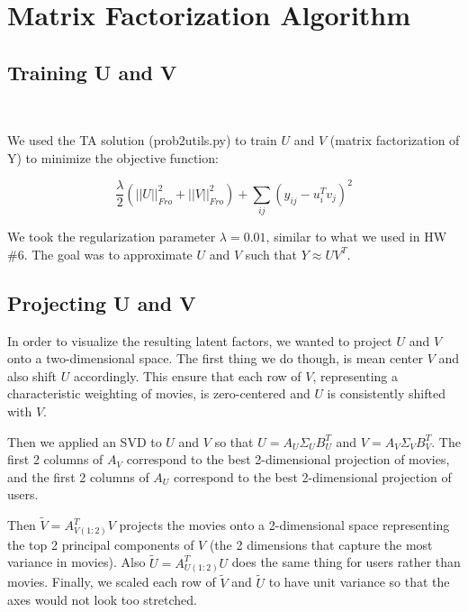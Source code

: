\section{Matrix Factorization Algorithm}

\medskip

\subsection{Training U and V}

~

We used the TA solution (prob2utils.py) to train $U$ and $V$  (matrix factorization of Y) to minimize the objective function:

$$\frac{\lambda}{2} ( ||U||_{Fro}^2 + ||V||_{Fro}^2) + \sum_{ij} (y_{ij} - u_i^T v_j)^2$$

We took the regularization parameter $\lambda = 0.01$, similar to what we used in HW \#6. The goal was to approximate $U$ and $V$ such that $Y \approx U V^T$. 

\subsection{Projecting U and V}

In order to visualize the resulting latent factors, we wanted to project $U$ and $V$ onto a two-dimensional space. The first thing we do though, is mean center $V$ and also shift $U$ accordingly.  This ensure that each row of $V$, representing a characteristic weighting of movies, is zero-centered and $U$ is consistently shifted with $V$. 

Then we applied an SVD to $U$ and $V$ so that $U = A_U \Sigma_U B_U^T$ and $V = A_V \Sigma_V B_V^T$. The first 2 columns of $A_V$ correspond to the best 2-dimensional projection of movies, and the first 2 columns of $A_U$ correspond to the best 2-dimensional projection of users.

Then $\tilde{V} = A_{V(1:2)}^T V$ projects the movies onto a 2-dimensional space representing the top 2 principal components of $V$ (the 2 dimensions that capture the most variance in movies). Also $\tilde{U} = A_{U(1:2)}^T U$ does the same thing for users rather than movies. Finally, we scaled each row of $\tilde{V}$ and $\tilde{U}$ to have unit variance so that the axes would not look too stretched.

